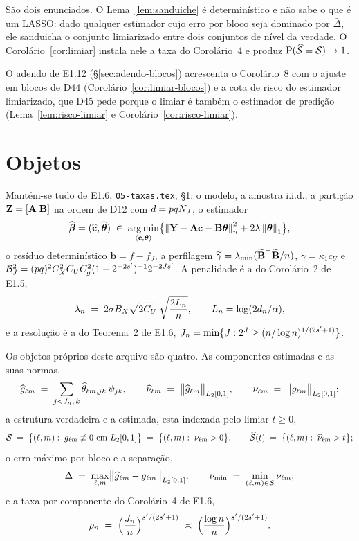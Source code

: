 \documentclass[11pt,a4paper]{article}
\newcommand{\lmin}{\lambda_{\min}}
\newcommand{\Amat}{\mathbf{A}}
\newcommand{\Bmat}{\mathbf{B}}
\newcommand{\bb}{\mathbf{b}}
\newcommand{\gtil}{\widetilde{\gamma}}
\newcommand{\Btil}{\widetilde{\Bmat}}
\newcommand{\bY}{\mathbf{Y}}
\newcommand{\bbeta}{\boldsymbol{\beta}}
\newcommand{\betahat}{\widehat{\bbeta}}
\newcommand{\ghat}[2]{\widehat{g}_{#1#2}}
\newcommand{\Nhat}[2]{\widehat{\nu}_{#1#2}}
\newcommand{\Ntrue}[2]{\nu_{#1#2}}
\newcommand{\Shat}{\widehat{\mathcal{S}}}
\newcommand{\sepmin}{\nu_{\min}}
\newcommand{\rn}{\rho}
\begin{document}
São dois enunciados. O Lema~\ref{lem:sanduiche} é determinístico e não sabe
o que é um LASSO: dado qualquer estimador cujo erro por bloco seja dominado
por $\bar{\Delta}$, ele sanduicha o conjunto limiarizado entre dois conjuntos de nível
da verdade. O Corolário~\ref{cor:limiar} instala nele a taxa do Corolário~4 e
produz $\Prob(\Shat = \mathcal{S}) \to 1$.

O adendo de E1.12 (§\ref{sec:adendo-blocos}) acrescenta o Corolário~8 com o
ajuste em blocos de D44 (Corolário~\ref{cor:limiar-blocos}) e a cota de risco
do estimador limiarizado, que D45 pede porque o limiar é também o estimador
de predição (Lema~\ref{lem:risco-limiar} e
Corolário~\ref{cor:risco-limiar}).

\section{Objetos}

Mantém-se tudo de E1.6, \texttt{05-taxas.tex}, §1: o modelo, a amostra
i.i.d., a partição $\bZ = [\Amat\;\Bmat]$ na ordem de D12 com
$d = pqN_{J}$, o estimador
\[
  \betahat = (\chat,\thetahat)
  \;\in\; \operatorname*{arg\,min}_{(\bc,\btheta)}
  \bigl\{\normn{\bY - \Amat\bc - \Bmat\btheta}^{2} + 2\pen\norm{\btheta}_{1}\bigr\},
\]
o resíduo determinístico $\bb = f - f_{J}$, a perfilagem
$\gtil = \lmin(\Btil\T\Btil/n)$, $\gamma = \kappa_{1}c_{U}$ e
$\mathcal{B}_{J}^{2} = (pq)^{2}C_{X}^{2}C_{U}C_{g}^{2}(1-2^{-2s'})^{-1}
2^{-2Js'}$. A penalidade é a do Corolário~2 de E1.5,
\[
  \lambda_{n} \;=\; 2\sigma B_{X}\sqrt{2C_{U}}\;\sqrt{\frac{2L_{n}}{n}},
  \qquad L_{n} = \log(2d_{n}/\alpha),
\]
e a resolução é a do Teorema~2 de E1.6,
$J_{n} = \min\{J : 2^{J}\ge(n/\log n)^{1/(2s'+1)}\}$.

Os objetos próprios deste arquivo são quatro. As componentes estimadas e as
suas normas,
\[
  \ghat{\cv}{\md} \;=\; \sum_{\lev<J_{n},\,\tsl}
  \widehat\theta_{\cv\md,\lev\tsl}\,\wav{\lev}{\tsl},
  \qquad
  \Nhat{\cv}{\md} \;=\; \bigl\lVert \ghat{\cv}{\md}\bigr\rVert_{L_{2}[0,1]},
  \qquad
  \Ntrue{\cv}{\md} \;=\; \bigl\lVert \gcomp{\cv}{\md}\bigr\rVert_{L_{2}[0,1]};
\]
a estrutura verdadeira e a estimada, esta indexada pelo limiar $t \ge 0$,
\[
  \mathcal{S} \;=\; \bigl\{(\cv,\md) :\; \gcomp{\cv}{\md} \not\equiv 0
  \text{ em } L_{2}[0,1]\bigr\}
  \;=\; \bigl\{(\cv,\md) :\; \Ntrue{\cv}{\md} > 0 \bigr\},
  \qquad
  \Shat(t) \;=\; \bigl\{(\cv,\md) :\; \Nhat{\cv}{\md} > t \bigr\};
\]
o erro máximo por bloco e a separação,
\[
  \Delta \;=\; \max_{\cv,\md}
  \bigl\lVert \ghat{\cv}{\md} - \gcomp{\cv}{\md}\bigr\rVert_{L_{2}[0,1]},
  \qquad
  \sepmin \;=\; \min_{(\cv,\md)\in \mathcal{S}} \Ntrue{\cv}{\md};
\]
e a taxa por componente do Corolário~4 de E1.6,
\begin{equation}
  \label{eq:rho}
  \rn_{n} \;=\; \Bigl(\frac{J_{n}}{n}\Bigr)^{\seff/(2\seff+1)}
  \;\asymp\; \Bigl(\frac{\log n}{n}\Bigr)^{\seff/(2\seff+1)} .
\end{equation}
\end{document}
